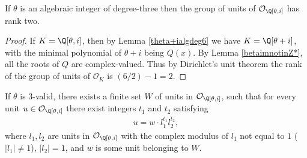 \documentclass[12pt]{amsart}
\newcommand{\1}{\mathmybb{1}}
\begin{document}
\begin{lem}
\label{ranktwounitlemmadeg6}
If $\theta$ is an algebraic integer of degree-three then the group of units of $\mathcal{O}_{\Q[\theta,i]}$ has rank two. 
\end{lem}
\begin{proof}
If $K=\Q[\theta,i]$, then by Lemma \ref{theta+ialgdeg6} we have $K = \Q[\theta+i]$, with the minimal polynomial of $\theta+i$ being $Q(x)$. By Lemma \ref{betaimnotinZ*}, all the roots of $Q$ are complex-valued. Thus by Dirichlet's unit theorem the rank of the group of units of $\mathcal{O}_{K}$ is $(6/2)-1 = 2$.
\end{proof}
\begin{lem}
\label{unitmodulusoneandnotmodulusone}
If $\theta$ is 3-valid, there exists a finite set $W$ of units in $\mathcal{O}_{\Q[\theta,i]}$, such that for every unit $u \in \mathcal{O}_{\Q[\theta,i]}$ there exist integers $t_{1}$ and $t_{2}$ satisfying
\begin{align*}
u = w\cdot l_{1}^{t_{1}}l_{2}^{t_{2}},
\end{align*}
where $l_{1},l_{2}$ are units in $\mathcal{O}_{\Q[\theta,i]}$ with the complex modulus of $l_{1}$ not equal to $1$ ($|l_{1}| \neq 1$), $|l_{2}| = 1$, and $w$ is some unit belonging to $W$.
\end{lem}
\end{document}
